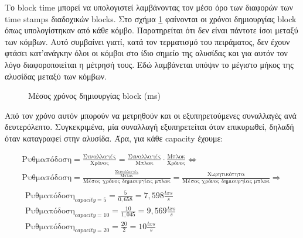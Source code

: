 \documentclass{article}
\newcommand{\eng}[1]{\foreignlanguage{english}{#1}} %
\begin{document}
Το \eng{block time} μπορεί να υπολογιστεί λαμβάνοντας τον μέσο όρο των
διαφορών των \eng{time stamps} διαδοχικών \eng{blocks}. Στο σχήμα
\ref{fig:throughput-blocktimes} φαίνονται οι χρόνοι δημιουργίας \eng{block} όπως
υπολογίστηκαν από κάθε κόμβο. Παρατηρείται ότι δεν είναι πάντοτε ίσοι μεταξύ
των κόμβων. Αυτό συμβαίνει γιατί, κατά τον τερματισμό του πειράματος, δεν έχουν
φτάσει κατ'ανάγκην όλοι οι κόμβοι στο ίδιο σημείο της αλυσίδας και για αυτόν τον
λόγο διαφοροποιείται η μέτρησή τους. Εδώ λαμβάνεται υπόψιν το μέγιστο μήκος της
αλυσίδας μεταξύ των κόμβων.

\begin{figure}[ht]
    \centering
    \begin{varwidth}{\linewidth}
        
    \end{varwidth}
    \caption{Μέσος χρόνος δημιουργίας \eng{block} (\eng{ms})}
    \label{fig:throughput-blocktimes}
\end{figure}

Από τον χρόνο αυτόν μπορούν να μετρηθούν και οι εξυπηρετούμενες συναλλαγές ανά δευτερόλεπτο.
Συγκεκριμένα, μία συναλλαγή εξυπηρετείται όταν επικυρωθεί, δηλαδή όταν καταγραφεί στην αλυσίδα.
Άρα, για κάθε \eng{capacity} έχουμε:

\begin{equation}
    \begin{gathered}
        \text{Ρυθμαπόδοση} = \frac{\text{Συναλλαγές}}{\text{Χρόνος}} = \frac{\text{Συναλλαγές}}{\text{Μπλοκ}}\cdot \frac{\text{Μπλοκ}}{\text{Χρόνος}} \Leftrightarrow \\
        \text{Ρυθμαπόδοση} = \frac{\frac{\text{Συναλλαγές}}{\text{Μπλοκ}} }{\text{Μέσος χρόνος δημιουργίας μπλοκ}} = \frac{\text{Χωρητικότητα}}{\text{Μέσος χρόνος δημιουργίας μπλοκ}} \Rightarrow \\
    \boxed{
        \begin{gathered}
            \text{Ρυθμαπόδοση}_{capacity=5} = \frac{5}{0,658} = 7,598 \text{} \frac{txs}{s}\\
            \text{Ρυθμαπόδοση}_{capacity=10} = \frac{10}{1,045} = 9,569 \text{} \frac{txs}{s}\\
            \text{Ρυθμαπόδοση}_{capacity=20} = \frac{20}{2} = 10 \text{} \frac{txs}{s}\\
        \end{gathered}
    }
    \end{gathered}
\end{equation}
\end{document}
